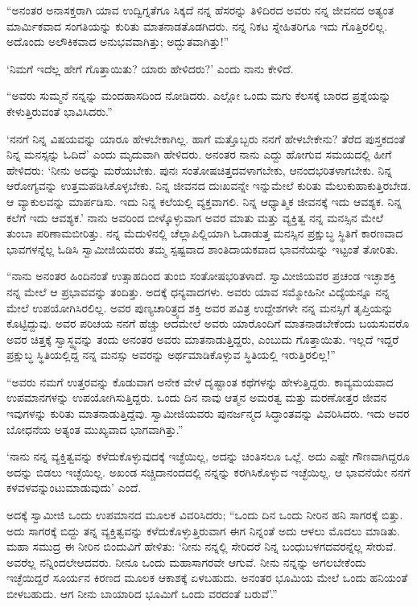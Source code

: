  “ಅನಂತರ ಅನಾಸಕ್ತರಾಗಿ ಯಾವ ಉದ್ವಿಗ್ನತೆಗೂ ಸಿಕ್ಕದೆ ನನ್ನ ಹೆಸರನ್ನು ತಿಳಿದಿರದ ಅವರು ನನ್ನ ಜೀವನದ ಅತ್ಯಂತ ಮಾರ್ಮಿಕವಾದ ಸಂಗತಿಯನ್ನು ಕುರಿತು ಮಾತನಾಡತೊಡಗಿದರು. ನನ್ನ ನಿಕಟ ಸ್ನೇಹಿತರಿಗೂ ಇದು ಗೊತ್ತಿರಲಿಲ್ಲ. ಅದೊಂದು ಅಲೌಕಿಕವಾದ ಅನುಭವವಾಗಿತ್ತು; ಅದ್ಭುತವಾಗಿತ್ತು!” 

 ‘ನಿಮಗೆ ಇದೆಲ್ಲ ಹೇಗೆ ಗೊತ್ತಾಯಿತು? ಯಾರು ಹೇಳಿದರು?’ ಎಂದು ನಾನು ಕೇಳಿದೆ. 

 “ಅವರು ಸುಮ್ಮನೆ ನನ್ನನ್ನು ಮಂದಹಾಸದಿಂದ ನೋಡಿದರು. ಎಲ್ಲೋ ಒಂದು ಮಗು ಕೆಲಸಕ್ಕೆ ಬಾರದ ಪ್ರಶ್ನೆಯನ್ನು ಕೇಳುತ್ತಿರುವಂತೆ ಭಾವಿಸಿದರು.” 

 ‘ನನಗೆ ನಿನ್ನ ವಿಷಯವನ್ನು ಯಾರೂ ಹೇಳಬೇಕಾಗಿಲ್ಲ. ಹಾಗೆ ಮತ್ತೊಬ್ಬರು ನನಗೆ ಹೇಳಬೇಕೇನು? ತೆರೆದ ಪುಸ್ತಕದಂತೆ ನಿನ್ನ ಮನಸ್ಸನ್ನು ಓದಿದೆ’ ಎಂದು ಮೃದುವಾಗಿ ಹೇಳಿದರು. ಅನಂತರ ನಾನು ಎದ್ದು ಹೋಗುವ ಸಮಯದಲ್ಲಿ ಹೀಗೆ ಹೇಳಿದರು: ‘ನೀನು ಅದನ್ನು ಮರೆಯಬೇಕು. ಪುನಃ ಸಂತೋಷಚಿತ್ತದವಳಾಗಬೇಕು, ಆನಂದಭರಿತಳಾಗಬೇಕು. ನಿನ್ನ ಆರೋಗ್ಯವನ್ನು ಉತ್ತಮಪಡಿಸಿಕೊಳ್ಳಬೇಕು. ನಿನ್ನ ಜೀವನದ ದುಃಖವನ್ನೇ ಇನ್ನುಮೇಲೆ ಕುರಿತು ಮೆಲುಕುಹಾಕುತ್ತಿರಬೇಡ. ಆ ವ್ಯಾಕುಲವನ್ನು ಮಾರ್ಪಡಿಸು. ಇದು ನಿನ್ನ ಕಲೆಯಲ್ಲಿ ವ್ಯಕ್ತವಾಗಲಿ. ನಿನ್ನ ಆಧ್ಯಾತ್ಮಿಕ ಜೀವನಕ್ಕೆ ಇದು ಆವಶ್ಯಕ. ನಿನ್ನ ಕಲೆಗೆ ಇದು ಆವಶ್ಯಕ.’ ನಾನು ಅವರಿಂದ ಬೀಳ್ಕೊಳ್ಳುವಾಗ ಅವರ ಮಾತು ಮತ್ತು ವ್ಯಕ್ತಿತ್ವ ನನ್ನ ಮನಸ್ಸಿನ ಮೇಲೆ ತುಂಬಾ ಪರಿಣಾಮಬೀರಿತ್ತು. ನನ್ನ ಮೆದುಳಿನಲ್ಲಿ ಚೆಲ್ಲಾಪಿಲ್ಲಿಯಾಗಿ ಓಡಾಡುತ್ತ ಮನಸ್ಸಿನ ಪ್ರಕ್ಷುಬ್ಧ ಸ್ಥಿತಿಗೆ ಕಾರಣವಾದ ಭಾವಗಳನ್ನೆಲ್ಲ ಓಡಿಸಿ ಸ್ವಾಮೀಜಿಯವರು ತಮ್ಮ ಸ್ಪಷ್ಟವಾದ ಶಾಂತಿದಾಯಕವಾದ ಭಾವನೆಯನ್ನು ಇಟ್ಟಂತೆ ತೋರಿತು. 

 “ನಾನು ಅನಂತರ ಹಿಂದಿನಂತೆ ಉತ್ಸಾಹದಿಂದ ತುಂಬಿ ಸಂತೋಷಭರಿತಳಾದೆ. ಸ್ವಾಮೀಜಿಯವರ ಪ್ರಚಂಡ ಇಚ್ಛಾಶಕ್ತಿ ನನ್ನ ಮೇಲೆ ಆ ಪ್ರಭಾವವನ್ನು ತಂದಿತ್ತು. ಅದಕ್ಕೆ ಧನ್ಯವಾದಗಳು. ಅವರು ಯಾವ ಸಮ್ಮೋಹಿನೀ ವಿದ್ಯೆಯನ್ನೂ ನನ್ನ ಮೇಲೆ ಉಪಯೋಗಿಸಿರಲಿಲ್ಲ. ಅವರ ಪುಣ್ಯಚಾರಿತ್ರ್ಯದ ಶಕ್ತಿ ಅವರ ಪವಿತ್ರ ಉದ್ದೇಶಗಳೇ ನನ್ನ ಮನಸ್ಸಿಗೆ ತೃಪ್ತಿಯನ್ನು ಕೊಟ್ಟಿದ್ದುವು. ಅವರ ಪರಿಚಯ ನನಗೆ ಹೆಚ್ಚು ಆದಮೇಲೆ ಅವರು ಯಾರೊಂದಿಗೆ ಮಾತನಾಡಬೇಕೆಂದು ಬಯಸುವರೊ ಅವರ ಚಿತ್ತಕ್ಕೆ ಸ್ವಾಸ್ಥ್ಯ\-ವನ್ನು ತಂದು ಅನಂತರ ಅವರು ಮಾತನಾಡುತ್ತಿದ್ದರು, ಎಂಬುದು ಗೊತ್ತಾಯಿತು. ಇಲ್ಲದೆ ಇದ್ದರೆ ಪ್ರಕ್ಷುಬ್ಧ ಸ್ಥಿತಿಯಲ್ಲಿದ್ದ ನನ್ನ ಮನಸ್ಸು ಅವರನ್ನು ಅರ್ಥಮಾಡಿಕೊಳ್ಳುವ ಸ್ಥಿತಿಯಲ್ಲಿ ಇರುತ್ತಿರಲಿಲ್ಲ!” 

 “ಅವರು ನಮಗೆ ಉತ್ತರವನ್ನು ಕೊಡುವಾಗ ಅನೇಕ ವೇಳೆ ದೃಷ್ಟಾಂತ ಕಥೆಗಳನ್ನು ಹೇಳುತ್ತಿದ್ದರು. ಕಾವ್ಯಮಯವಾದ ಉಪಮಾನಗಳನ್ನು ಉಪಯೋಗಿಸುತ್ತಿದ್ದರು. ಒಂದು ದಿನ ನಾವು ಆತ್ಮನ ಅಮರತ್ವ ಮತ್ತು ಮರಣೋತ್ತರ ಜೀವನ ಇವುಗಳನ್ನು ಕುರಿತು ಮಾತನಾಡುತ್ತಿದ್ದೆವು. ಸ್ವಾಮೀಜಿಯವರು ಪುನರ್ಜನ್ಮದ ಸಿದ್ಧಾಂತವನ್ನು ವಿವರಿಸಿದರು. ಇದು ಅವರ ಬೋಧನೆಯ ಅತ್ಯಂತ ಮುಖ್ಯವಾದ ಭಾಗವಾಗಿತ್ತು.” 

 ‘ನಾನು ನನ್ನ ವ್ಯಕ್ತಿತ್ವವನ್ನು ಕಳೆದುಕೊಳ್ಳುವುದಕ್ಕೆ ಇಚ್ಛೆಯಿಲ್ಲ, ಅದನ್ನು ಚಿಂತಿಸಲೂ ಒಲ್ಲೆ. ಅದು ಎಷ್ಟೇ ಗೌಣವಾಗಿದ್ದರೂ ಅದನ್ನು ಬಿಡಲು ಇಚ್ಛೆಯಿಲ್ಲ. ಅಖಂಡ ಸಚ್ಚಿದಾನಂದದಲ್ಲಿ ನನ್ನನ್ನು ಕರಗಿಸಿಕೊಳ್ಳುವ ಇಚ್ಛೆಯಿಲ್ಲ. ಆ ಭಾವನೆಯೇ ನನಗೆ ಕಳವಳವನ್ನುಂಟುಮಾಡುವುದು’ ಎಂದೆ. 

 ಅದಕ್ಕೆ ಸ್ವಾಮೀಜಿ ಒಂದು ಉಪಮಾನದ ಮೂಲಕ ವಿವರಿಸಿದರು; “ಒಂದು ದಿನ ಒಂದು ನೀರಿನ ಹನಿ ಸಾಗರಕ್ಕೆ ಬಿತ್ತು. ಅದು ಸಾಗರಕ್ಕೆ ಬಿದ್ದು ತನ್ನ ವ್ಯಕ್ತಿತ್ವವನ್ನು ಕಳೆದುಕೊಳ್ಳುತ್ತಿರುವಾಗ ಈಗ ನಿನ್ನಂತೆ ಅದು ಆಳಲು ಮೊದಲು ಮಾಡಿತು. ಮಹಾ ಸಮುದ್ರ ಈ ನೀರಿನ ಬಿಂದುವಿಗೆ ಹೇಳಿತು: ‘ನೀನು ನನ್ನಲ್ಲಿ ಸೇರಿದರೆ ನಿನ್ನ ಬಂಧುಬಳಗದವರನ್ನೆಲ್ಲ ಸೇರುವೆ. ಅವರೆಲ್ಲ ನನ್ನಿಂದಲೇ‌ಆದವರು. ನೀನೂ ಒಂದು ಮಹಾಸಾಗರವೇ ಆಗುವೆ. ನೀನು ನನ್ನನ್ನು ಅಗಲಬೇಕೆಂದು ಇಚ್ಛೆಯಿದ್ದರೆ ಸೂರ್ಯನ ಕಿರಣದ ಮೂಲಕ ಆಕಾಶಕ್ಕೆ ಏಳಬಹುದು. ಅನಂತರ ಭೂಮಿಯ ಮೇಲೆ ಒಂದು ಹನಿಯಂತೆ ಬೀಳಬಹುದು. ಆಗ ನೀನು ಬಾಯಾರಿದ ಭೂಮಿಗೆ ಒಂದು ವರದಂತೆ ಬರುವೆ’.” 

